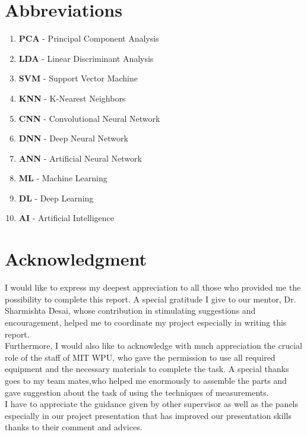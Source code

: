\documentclass[openany]{report}
\begin{document}
\listoffigures
\clearpage
\listoftables
\clearpage

\chapter*{Abbreviations}

\begin{enumerate}
    \item \textbf{PCA} - Principal Component Analysis
    \item \textbf{LDA} - Linear Discriminant Analysis
    \item \textbf{SVM} - Support Vector Machine
    \item \textbf{KNN} - K-Nearest Neighbors
    \item \textbf{CNN} - Convolutional Neural Network
    \item \textbf{DNN} - Deep Neural Network
    \item \textbf{ANN} - Artificial Neural Network
    \item \textbf{ML} - Machine Learning
    \item \textbf{DL} - Deep Learning
    \item \textbf{AI} - Artificial Intelligence
\end{enumerate}

\chapter*{Acknowledgment}
\thispagestyle{empty}

I would like to express my deepest appreciation to all those who provided me the possibility to complete this report. A special gratitude I give to our mentor, Dr. Sharmishta Desai, whose contribution in stimulating suggestions and encouragement, helped me to coordinate my project especially in writing this report.\\

Furthermore, I would also like to acknowledge with much appreciation the crucial role of the staff of MIT WPU, who gave the permission to use all required equipment and the necessary materials to complete the task. A special thanks goes to my team mates,who helped me enormously to assemble the parts and gave suggestion about the task of using the techniques of measurements.\\

I have to appreciate the guidance given by other supervisor as well as the panels especially in our project presentation that has improved our presentation skills thanks to their comment and advices.\\
\end{document}
